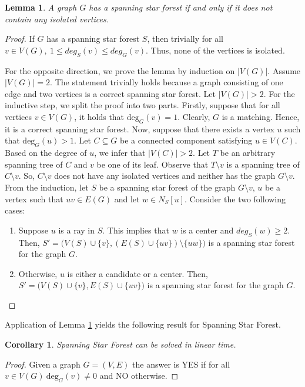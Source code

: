 \documentclass[en]{pracamgr}
\newtheorem{lemma}{Lemma}
\newtheorem{corollary}{Corollary}
\newcommand{\ssf}{spanning star forest}
\newcommand{\ssfp}{{\sc Spanning Star Forest}}
\newcommand{\degree}[2]{\textrm{deg}_{#1}(#2)}
\begin{document}
\begin{lemma}\label{SSF lemma}
 A graph $G$ has a \ssf{} if and only if it does not contain any isolated vertices.
\end{lemma}

\begin{proof}
	If $G$ has a \ssf{} $S$, then trivially for all $v \in V(G),\ 1 \leq deg_S(v) \leq deg_G(v)$. Thus, none of the vertices is isolated.
	
	For the opposite direction, we prove the lemma by induction on $|V(G)|$. Assume $|V(G)|=2$. The statement trivially holds because a graph consisting of one edge and two vertices is a correct \ssf{}. Let $|V(G)| >2$. For the inductive step, we split the proof into two parts. Firstly, suppose that for all vertices $v \in V(G)$, it holds that $\degree{G}{v}=1$.  Clearly, $G$ is a matching. Hence, it is a correct \ssf{}. Now, suppose that there exists a vertex $u$ such that $\degree{G}{u}>1$. Let $C \subseteq G$ be a connected component satisfying $u \in V(C)$. Based on the degree of $u$, we infer that $|V(C)|>2$. Let $T$ be an arbitrary spanning tree of $C$ and $v$ be one of its leaf. Observe that $T \setminus v$ is a spanning tree of $C \setminus v$. So, $C \setminus v$ does not have any isolated vertices and neither has the graph $G \setminus v$. From the induction, let $S$ be a \ssf{} of the graph $G \setminus v$, $u$ be a vertex such that $uv \in E(G)$ and let $w \in N_S[u]$. Consider the two following cases:
	\begin{enumerate}
		\item Suppose $u$ is a ray in $S$. This implies that $w$ is a center and $deg_S(w) \geq 2$. Then, $S'=\big(V(S) \cup \{v\},(E(S) \cup \{uv\}) \setminus \{uw\}\big)$ is a spanning star forest for the graph $G$.
		\item Otherwise, $u$ is either a candidate or a center. Then, $S'=\big(V(S) \cup \{v\}, E(S) \cup \{uv\}\big)$ is a spanning star forest for the graph $G$.
	\end{enumerate}
	
\end{proof}

Application of Lemma \ref{SSF lemma} yields the following result for \ssfp{}.

\begin{corollary}
	\ssfp{} can be solved in linear time.
\end{corollary}

\begin{proof}
	Given a graph $G = (V,E)$ the answer is YES if for all $v \in V(G)\ \degree{G}{v} \neq 0$ and NO otherwise.
\end{proof}
\end{document}
